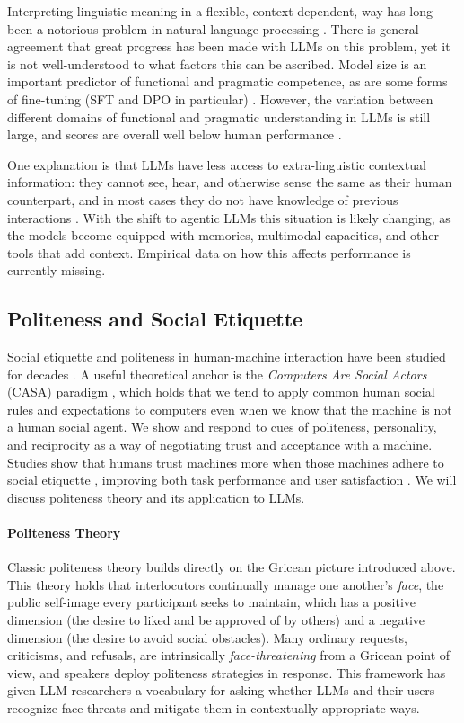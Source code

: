 Interpreting linguistic meaning in a flexible, context-dependent, way has long been a notorious problem in natural language processing \citep{trott-etal-2020-construing}. There is general agreement that great progress has been made with LLMs on this problem, yet it is not well-understood to what factors this can be ascribed. Model size is an important predictor of functional and pragmatic competence, as are some forms of fine-tuning (SFT and DPO in particular) \citep{yu-etal-2026-pragmatic, ruis2023goldilocks}. However, the variation  between different domains of functional and pragmatic understanding in LLMs is still large, and scores are overall well below human performance \citep{sravanthi2024-pub}. 

One explanation  is that LLMs have less access to extra-linguistic contextual information: they cannot see, hear, and otherwise sense the same as their human counterpart, and in most cases they do not have knowledge of previous interactions \citep{vandermeulen2025properly}. With the shift to agentic LLMs this situation is likely changing, as the models become  equipped with memories, multimodal capacities, and other tools that add context. Empirical data on how this affects performance is currently missing.

\subsection{Politeness and Social Etiquette}
Social etiquette and politeness in human-machine interaction have been studied for decades \citep{ribino2023role}. A useful theoretical anchor  is the \emph{Computers Are Social Actors} (CASA) paradigm \citep{nass1994computers}, which holds that we tend to apply common human social rules and expectations to computers even when we know that the machine is not a human social agent. We show and respond to cues of politeness, personality, and reciprocity as a way of negotiating trust and acceptance with a machine. Studies show that humans trust machines more when those machines adhere to social etiquette \citep{miller2005}, improving both task performance and user satisfaction \citep{miyamoto2021}. We will discuss politeness theory and its application to LLMs.

\paragraph{Politeness Theory}
Classic politeness theory \citep[e.g.][]{brown1987politeness} builds directly on the Gricean picture introduced above. This theory holds that %
interlocutors continually manage one another's \emph{face}, the public self-image every participant seeks to maintain, which has a positive dimension (the desire to liked and be approved of by others) and a negative dimension (the desire to avoid social obstacles). Many ordinary requests, criticisms, and refusals, are intrinsically \emph{face-threatening} from a Gricean point of view, and speakers deploy politeness strategies in response. This framework has given LLM researchers a vocabulary for asking whether LLMs and their users recognize face-threats and mitigate them in contextually appropriate ways.

